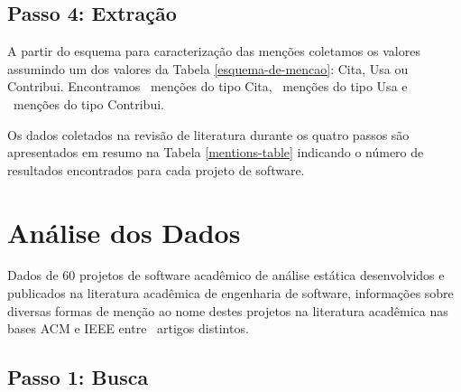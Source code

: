 

\subsection{Passo 4: Extração}


A partir do esquema para caracterização das menções coletamos os valores
assumindo um dos valores da Tabela
\ref{esquema-de-mencao}: Cita, Usa ou
Contribui. Encontramos \CiteCount \ menções do tipo Cita,
\UseCount \ menções do tipo Usa e
\ContributeCount \ menções do tipo Contribui.

Os dados coletados na revisão de literatura durante os quatro passos são
apresentados em resumo na Tabela \ref{mentions-table} indicando o
número de resultados encontrados para cada projeto de software.




\section{Análise dos Dados} \label{estudo2:analise} %

Dados de 60 projetos de software acadêmico de análise estática desenvolvidos e
publicados na literatura acadêmica de engenharia de software, informações sobre
diversas formas de menção ao nome destes projetos na literatura acadêmica nas
bases ACM e IEEE entre \SearchUniqueCount \ artigos distintos.

\subsection{Passo 1: Busca}

